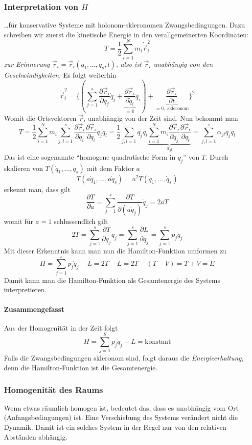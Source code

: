 \documentclass[oneside]{book}
\theoremstyle{definition}
\newcommand{\ffpartial}[2]{\frac{\partial #1}{\partial #2}}
\newcommand{\dotvec}[1]{\dot{\vec{#1}}}
\newcommand{\const}{\text{konstant}}
\begin{document}
\subsubsection{Interpretation von $H$} \dots für konservative Systeme mit holonom-skleronomen Zwangsbedingungen.
Dazu schreiben wir zuerst die kinetische Energie in den verallgemeinerten Koordinaten:
$$T = \frac12 \sum_{i=1}^N m_i \dotvec{r}_i^2$$
\textit{zur Erinnerung $\vec{r}_i = \vec{r}_i(q_1, \dots, q_s, t)$, also ist $\vec{r}_i$ unabhängig von den Geschwindigkeiten.} Es folgt weiterhin
$$\dotvec{r}_i^2 = \{(\sum_{j=1}^s \ffpartial{\vec{r}_i}{q_j} \dot{q}_j + \underbrace{\ffpartial{\vec{r}_i}{\dot{q}_i}}_{=0} \ddot{q}_i) + \underbrace{\ffpartial{\vec{r}_i}{t}}_{=0, \text{ skleronom}}\}^2 $$
Womit die Ortsvektoren $\vec{r}_i$ unabhängig von der Zeit sind. Nun bekommt man
$$T = \frac12 \sum_{i=1}^N m_i \sum_{j,l=1}^{s} \ffpartial{\vec{r}_i}{q_i} \ffpartial{\vec{r}_i}{q_l} \dot{q}_j \dot{q}_l = \frac12 \sum_{j,l = 1}^{} \dot{q_j} \dot{q_l} \underbrace{\sum_{i=1}^N m_i \ffpartial{\vec{r}_i}{q_j} \ffpartial{\vec{r}_i}{q_l}}_{\alpha_{jl}} = \sum_{j,l=1}^s \alpha_{jl} \dot{q}_j \dot{q}_l$$
Das ist eine sogenannte "`homogene quadratische Form in $\dot{q}_j$"' von $T$.
Durch skalieren von $T(\dot{q}_1, \dots, \dot{q}_s)$ mit dem Faktor $a$
$$T(a \dot{q}_1, \dots, a \dot{q}_s) = a^2 T(\dot{q}_1, \dots, \dot{q}_s)$$
erkennt man, dass gilt
$$\ffpartial{T}{a} = \sum_{j=1}^s \ffpartial{T}{(a \dot{q}_j)}\dot{q}_j = 2 a T$$
womit für $a = 1$ schlussendlich  gilt
$$ 2 T = \sum_{j=1}^s \ffpartial{T}{\dot{q}_j} \dot{q}_j = \sum_{j=1}^s \ffpartial{L}{\dot{q}_j} = \sum_{j=1}^s p_j \dot{q}_j$$
Mit dieser Erkenntnis kann man nun die Hamilton-Funktion umformen zu
$$H = \sum_{j=1}^s p_j \dot{q}_j - L = 2T - L = 2 T - (T-V) = T + V = E$$
Damit kann man die Hamilton-Funktion als Gesamtenergie des Systems interpretieren.






\paragraph{Zusammengefasst}
Aus der Homogenität in der Zeit folgt
\[H=\sum\limits_{j=1}^S p_j\dot q_j - L = \const\]
Falls die Zwangsbedingungen skleronom sind, folgt daraus die \emph{Energieerhaltung}, denn die Hamilton-Funktion ist die Gesamtenergie.

\subsubsection{Homogenität des Raums}
Wenn etwas räumlich homogen ist, bedeutet das, dass es unabhängig vom Ort (Anfangsbedingungen) ist. Eine Verschiebung des Systems verändert nicht die Dynamik. Damit ist ein solches System in der Regel nur von den relativen Abständen abhängig.
\end{document}
